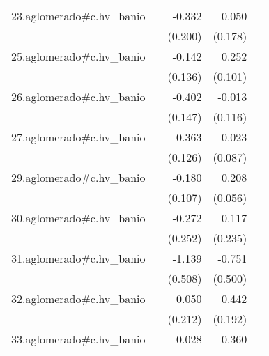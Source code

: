 {\begin{longtable}{l*{4}{D{.}{.}{-1}}}
\addlinespace
23.aglomerado#c.hv\_banio&                     &      -0.332         &       0.050         &                     \\
            &                     &     (0.200)         &     (0.178)         &                     \\
\addlinespace
25.aglomerado#c.hv\_banio&                     &      -0.142         &       0.252\sym{*}  &                     \\
            &                     &     (0.136)         &     (0.101)         &                     \\
\addlinespace
26.aglomerado#c.hv\_banio&                     &      -0.402\sym{**} &      -0.013         &                     \\
            &                     &     (0.147)         &     (0.116)         &                     \\
\addlinespace
27.aglomerado#c.hv\_banio&                     &      -0.363\sym{**} &       0.023         &                     \\
            &                     &     (0.126)         &     (0.087)         &                     \\
\addlinespace
29.aglomerado#c.hv\_banio&                     &      -0.180         &       0.208\sym{***}&                     \\
            &                     &     (0.107)         &     (0.056)         &                     \\
\addlinespace
30.aglomerado#c.hv\_banio&                     &      -0.272         &       0.117         &                     \\
            &                     &     (0.252)         &     (0.235)         &                     \\
\addlinespace
31.aglomerado#c.hv\_banio&                     &      -1.139\sym{*}  &      -0.751         &                     \\
            &                     &     (0.508)         &     (0.500)         &                     \\
\addlinespace
32.aglomerado#c.hv\_banio&                     &       0.050         &       0.442\sym{*}  &                     \\
            &                     &     (0.212)         &     (0.192)         &                     \\
\addlinespace
33.aglomerado#c.hv\_banio&                     &      -0.028         &       0.360\sym{***}&                     \\

\end{longtable}}
